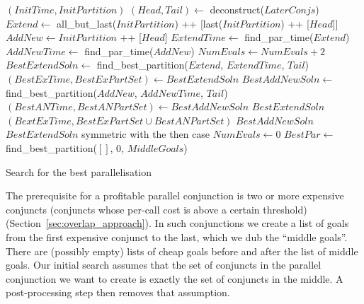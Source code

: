 \begin{algorithm}[tbp]
\begin{algorithmic}[5]
    \State \Return $(InitTime, InitPartition)$
  \Else
    \State $(Head, Tail) \gets$ deconstruct($LaterConjs$)
    \State $Extend \gets$ all\_but\_last($InitPartition$) ++
        [last($InitPartition$) ++ [$Head$]]
    \State $AddNew \gets InitPartition$ ++ [$Head$]
    \State $ExtendTime \gets$ find\_par\_time($Extend$)
    \State $AddNewTime \gets$ find\_par\_time($AddNew$)
    \State $NumEvals \gets NumEvals + 2$
      \State $BestExtendSoln \gets$ find\_best\_partition($Extend$,
        $ExtendTime$, $Tail$)
      \State $(BestExTime, BestExPartSet) \gets BestExtendSoln$
        \State $BestAddNewSoln \gets$ find\_best\_partition($AddNew$,
            $AddNewTime$, $Tail$)
        \State $(BestANTime, BestANPartSet) \gets BestAddNewSoln$
          \State \Return $BestExtendSoln$
          \State \Return $(BextExTime, BestExPartSet \cup BestANPartSet)$
        \Else
          \State \Return $BestAddNewSoln$
        \EndIf
      \Else
        \State \Return $BestExtendSoln$
      \EndIf
    \Else
      \State symmetric with the then case
    \EndIf
  \EndIf
\EndProcedure
\State
\State $NumEvals \gets 0$
\State $BestPar \gets$ find\_best\_partition($[]$, 0, $MiddleGoals$)
\end{algorithmic}
\caption{Search for the best parallelisation}
\label{alg:best_par_search}
\end{algorithm}

The prerequisite for a profitable parallel conjunction is two or more
expensive conjuncts (conjuncts whose per-call cost is above a certain
threshold)
(Section~\ref{sec:overlap_approach}).
In such conjunctions we create a list of goals from the first expensive
conjunct to the last,
which we dub the ``middle goals''.
There are (possibly empty) lists of cheap goals before and after the 
list of middle goals.
Our initial search assumes that
the set of conjuncts in the parallel conjunction we want to create
is exactly the set of conjuncts in the middle.
A post-processing step then removes that assumption.


